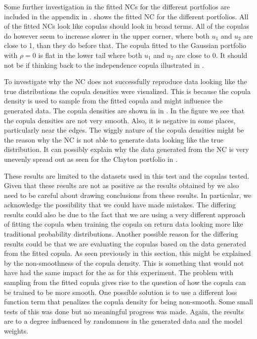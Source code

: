 Some further investigation in the fitted \gls{NC}s for the different portfolios are included in the appendix in .  shows the fitted \gls{NC} for the different portfolios. All of the fitted \gls{NC}s look like copulas should look in broad terms. All of the copulas do however seem to increase slower in the upper corner, where both $u_1$ and $u_2$ are close to 1, than they do before that. The copula fitted to the Gaussian portfolio with $\rho = 0$ is flat in the lower tail where both $u_1$ and $u_2$ are close to 0. It should not be if thinking back to the independence copula illustrated in .      

To investigate why the \gls{NC} does not successfully reproduce data looking like the true distributions the copula densities were visualized. This is because the copula density is used to sample from the fitted copula and might influence the generated data. The copula densities are shown in  in . In the figure we see that the copula densities are not very smooth. Also, it is negative in some places, particularly near the edges. The wiggly nature of the copula densities might be the reason why the \gls{NC} is not able to generate data looking like the true distribution. It can possibly explain why the data generated from the \gls{NC} is very unevenly spread out as seen for the Clayton portfolio in . 

These results are limited to the datasets used in this test and the copulas tested. Given that these results are not as positive as the results obtained by  we also need to be careful about drawing conclusions from these results. In particular, we acknowledge the possibility that we could have made mistakes. The differing results could also be due to the fact that we are using a very different approach of fitting the copula when training the copula on return data looking more like traditional probability distributions. Another possible reason for the differing results could be that we are evaluating the copulas based on the data generated from the fitted copula. As seen previously in this section, this might be explained by the non-smoothness of the copula density. This is something that would not have had the same impact for the  as for this experiment. The problem with sampling from the fitted copula gives rise to the question of how the copula can be trained to be more smooth. One possible solution is to use a different loss function term that penalizes the copula density for being non-smooth. Some small tests of this was done but no meaningful progress was made. Again, the results are to a degree influenced by randomness in the generated data and the model weights. 





